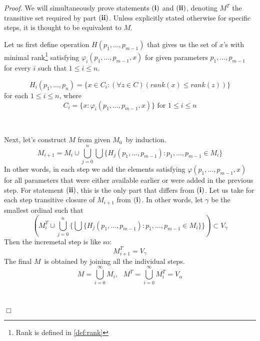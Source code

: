 \documentclass[12pt,a4paper]{article}
\newenvironment{proof}
{\noindent \textit{Proof.}}
{\hspace*{\fill} $\Box$}
\begin{document}
\begin{proof}
We will simultaneously prove statements $\bold{(i)}$ and $\bold{(ii)}$, denoting $M^T$ the transitive set required by part $\bold{(ii)}$. Unless explicitly stated otherwise for specific steps, it is thought to be equivalent to $M$.

Let us first define operation $H(p_1, \ldots, p_{m-1})$ that gives us the set of $x$'s with minimal rank\footnote{Rank is defined in \ref{def:rank}} satisfying $\varphi_i(p_1, \ldots, p_{m-1}, x)$ for given parameters $p_1, \ldots, p_{m-1}$ for every $i$ such that $1 \leq i \leq n$.

\begin{equation}
H_i(p_1, \ldots, p_n) = \{x \in C_i: (\forall z \in C)(rank(x) \leq rank(z))\}
\end{equation}
for each $1 \leq i \leq n$, where
\begin{equation}
C_i = \{x: \varphi_i(p_1, \ldots, p_{m-1}, x)\} \mbox{ for $1 \leq i \leq n$}
\end{equation}

\

Next, let's construct $M$ from given $M_0$ by induction. 
\begin{equation}
M_{i+1} = M_i \cup \bigcup_{j=0}^{n} \bigcup \{H_j(p_1, \ldots, p_{m-1}): p_1, \ldots, p_{m-1} \in M_i\}
\end{equation}
In other words, in each step we add the elements satisfying $\varphi(p_1, \ldots, p_{m-1}, x)$ for all parameters that were either available earlier or were added in the previous step. 
For statement $\bold{(ii)}$, this is the only part that differs from $\bold{(i)}$. Let us take for each step transitive closure of $M_{i+1}$ from $\bold{(i)}$. In other words, let $\gamma$ be the smallest ordinal such that 
\begin{equation}
(M^T_i \cup \bigcup_{j=0}^{n} \{\bigcup\{H_j(p_1, \ldots, p_{m-1}): p_1, \ldots, p_{m-1} \in M_i\}\}) \subset V_\gamma
\end{equation}
Then the incremetal step is like so:
\begin{equation}
M^T_{i+1} = V_\gamma
\end{equation}
The final $M$ is obtained by joining all the individual steps. 
\begin{equation}
M = \bigcup_{i=0}^{\infty} M_i, \mbox{  }M^T = \bigcup_{i=0}^{\infty} M^T_i = V_\alpha
\end{equation}

\


\end{proof}
\end{document}
